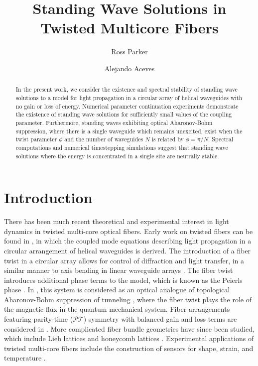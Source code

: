 \documentclass[reprint, amsmath,amssymb,aps]{revtex4-2}
\begin{document}
\title{Standing Wave Solutions in Twisted Multicore Fibers}

\author{Ross Parker}
\address{Department of Mathematics, Southern Methodist Univeristy, 
Dallas, TX 75275}

\author{Alejando Aceves}
\address{Department of Mathematics, Southern Methodist Univeristy, 
Dallas, TX 75275}

\begin{abstract}
In the present work, we consider the existence and spectral stability of standing wave solutions to a model for light propagation in a circular array of helical waveguides with no gain or loss of energy. Numerical parameter continuation experiments demonstrate the existence of standing wave solutions for sufficiently small values of the coupling parameter. Furthermore, standing waves exhibiting optical Aharonov-Bohm suppression, where there is a single waveguide which remains unexcited, exist when the twist parameter $\phi$ and the number of waveguides $N$ is related by $\phi = \pi/N$. Spectral computations and numerical timestepping simulations suggest that standing wave solutions where the energy is concentrated in a single site are neutrally stable. 
\end{abstract}

\maketitle

\section{Introduction}

There has been much recent theoretical and experimental interest in light dynamics in twisted multi-core optical fibers. Early work on twisted fibers can be found in \cite{Longhi2007,Longhi2007b}, in which the coupled mode equations describing light propagation in a circular arrangement of helical waveguides is derived. The introduction of a fiber twist in a circular array allows for control of diffraction and light transfer, in a similar manner to axis bending in linear waveguide arrays \cite{Longhi2005}. The fiber twist introduces additional phase terms to the model, which is known as the Peierls phase \cite{Longhi2007,Peierls1933}. In \cite{Ornigotti2007}, this system is considered as an optical analogue of topological Aharonov-Bohm suppression of tunneling \cite{Loss1992}, where the fiber twist plays the role of the magnetic flux in the quantum mechanical system. Fiber arrangements featuring parity-time ($\mathcal{PT}$) symmetry with balanced gain and loss terms are considered in \cite{Longhi2016,castro2016}. More complicated fiber bundle geometries have since been studied, which include Lieb lattices \cite{Marzuola2019bulk} and honeycomb lattices \cite{Ablowitz2014,Lumer2013}. Experimental applications of twisted multi-core fibers include the construction of sensors for shape, strain, and temperature \cite{Gannot2014,Westbrook2017}. 
\end{document}
